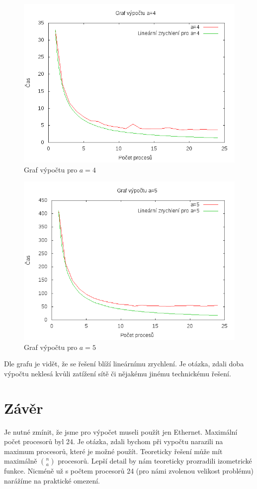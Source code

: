 \documentclass[a4paper,10pt]{report}
\begin{document}
\begin{figure}[H]
  \centering
    \includegraphics[width=1\textwidth]{../data/star_logs/graf4.png}
  \caption{Graf výpočtu pro $a=4$}
  \label{fig:fou}
\end{figure}

\begin{figure}[H]
  \centering
    \includegraphics[width=1\textwidth]{../data/star_logs/graf5.png}
  \caption{Graf výpočtu pro $a=5$}
  \label{fig:fiv}
\end{figure}

Dle grafu je vidět, že se řešení blíží lineárnímu zrychlení. Je otázka, zdali doba výpočtu neklesá kvůli zatížení sítě či nějakému jinému technickému řešení.

\chapter{Závěr}

Je nutné zmínit, že jsme pro výpočet museli použít jen Ethernet. Maximální počet procesorů byl 24. Je otázka, zdali bychom při vypočtu narazili na maximum procesorů, které je možné použít. Teoreticky řešení může mít maximálně ${n \choose a}$ procesorů. Lepší detail by nám teoreticky prozradili izometrické funkce. Nicméně už s počtem procesorů 24 (pro námi zvolenou velikost problému) narážíme na praktické omezení.
\end{document}
